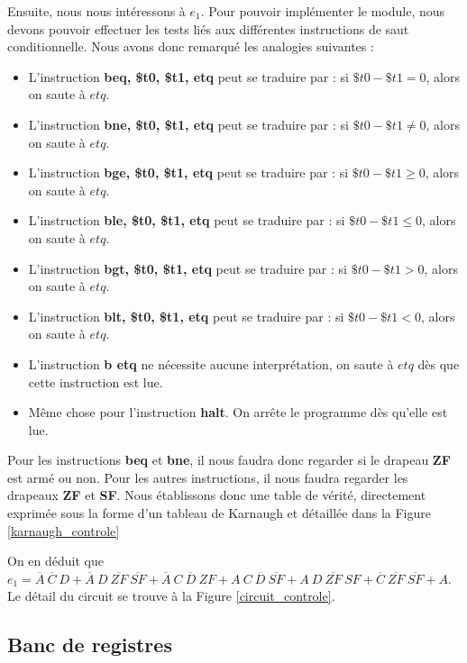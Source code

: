\documentclass[10pt,a4paper]{article}
\begin{document}
Ensuite, nous nous intéressons à $e_1$. Pour pouvoir implémenter le module, nous devons pouvoir effectuer les tests liés aux différentes instructions de saut conditionnelle. Nous avons donc remarqué les analogies suivantes :
\begin{itemize}
\item L'instruction \textbf{beq, \$t0, \$t1, etq} peut se traduire par : si $\$t0 - \$t1 = 0$, alors on saute à $etq$.
\item L'instruction \textbf{bne, \$t0, \$t1, etq} peut se traduire par : si $\$t0 - \$t1\neq0$, alors on saute à $etq$.
\item L'instruction \textbf{bge, \$t0, \$t1, etq} peut se traduire par : si $\$t0 - \$t1 \geq0$, alors on saute à $etq$.
\item L'instruction \textbf{ble, \$t0, \$t1, etq} peut se traduire par : si $\$t0 - \$t1 \leq0$, alors on saute à $etq$.
\item L'instruction \textbf{bgt, \$t0, \$t1, etq} peut se traduire par : si $\$t0 - \$t1 > 0$, alors on saute à $etq$.
\item L'instruction \textbf{blt, \$t0, \$t1, etq} peut se traduire par : si $\$t0 - \$t1 < 0$, alors on saute à $etq$.
\item L'instruction \textbf{b etq} ne nécessite aucune interprétation, on saute à $etq$ dès que cette instruction est lue.
\item Même chose pour l'instruction \textbf{halt}. On arrête le programme dès qu'elle est lue.
\end{itemize}
\vspace{0.2cm}
Pour les instructions \textbf{beq} et \textbf{bne}, il nous faudra donc regarder si le drapeau \textbf{ZF} est armé ou non. Pour les autres instructions, il nous faudra regarder les drapeaux \textbf{ZF} et \textbf{SF}. Nous établissons donc une table de vérité, directement exprimée sous la forme d'un tableau de Karnaugh et détaillée dans la Figure \ref{karnaugh_controle}

On en déduit que $e_1 = \overline{A}~\overline{C}~D + \overline{A}~D~\overline{ZF}~\overline{SF} + \overline{A}~C~\overline{D}~ZF + A~C~\overline{D}~\overline{SF} + A~D~\overline{ZF}~SF + \overline{C}~\overline{ZF}~\overline{SF} + A$. Le détail du circuit se trouve à la Figure \ref{circuit_controle}.

\subsection{Banc de registres}
\end{document}
